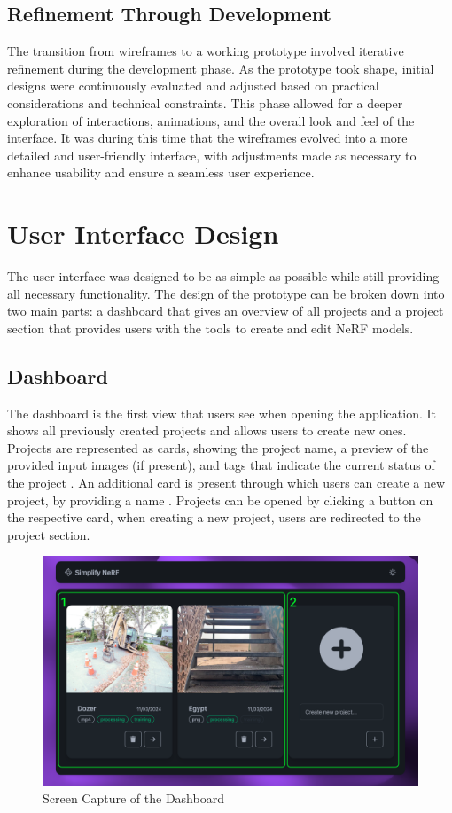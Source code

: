\subsection*{Refinement Through Development}

The transition from wireframes to a working prototype involved iterative refinement during the development phase.
As the prototype took shape, initial designs were continuously evaluated and adjusted based on practical considerations and technical constraints.
This phase allowed for a deeper exploration of interactions, animations, and the overall look and feel of the interface.
It was during this time that the wireframes evolved into a more detailed and user-friendly interface, with adjustments made as necessary to enhance usability and ensure a seamless user experience.

\section{User Interface Design}
The user interface was designed to be as simple as possible while still providing all necessary functionality.
The design of the prototype can be broken down into two main parts: a dashboard that gives an overview of all projects and a project section that provides users with the tools to create and edit NeRF models.

\subsection*{Dashboard}

The dashboard is the first view that users see when opening the application.
It shows all previously created projects and allows users to create new ones.
Projects are represented as cards, showing the project name, a preview of the provided input images (if present), and tags that indicate the current status of the project .
An additional card is present through which users can create a new project, by providing a name .
Projects can be opened by clicking a button on the respective card, when creating a new project, users are redirected to the project section.

\begin{figure}[htb]
  \centering
  \includegraphics[width=.7\textwidth]{figures/view-overview.png}
  \caption{Screen Capture of the Dashboard}
  \label{fig:design:dashboard}
\end{figure}

